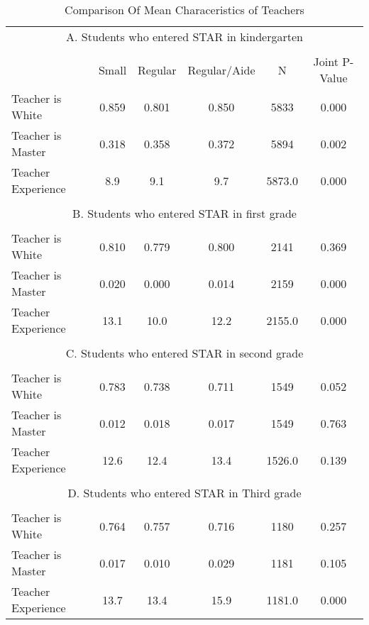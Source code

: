 \documentclass{article}
\begin{document}
\begin{table}[htbp]
  \centering
  \caption{Comparison Of Mean Characeristics of Teachers}
    \begin{tabular}{llccccc}
    \toprule
    \multicolumn{7}{c}{A. Students who entered STAR in kindergarten} \\
          &       &       &       &       &       &  \\
          &       & Small & Regular & Regular/Aide & N     & Joint P-Value \\
    \midrule
    \multicolumn{2}{l}{Teacher is White} & 0.859  & 0.801  & 0.850  & 5833  & 0.000  \\
    \multicolumn{2}{l}{Teacher is Master} & 0.318  & 0.358  & 0.372  & 5894  & 0.002  \\
    \multicolumn{2}{l}{Teacher Experience} & 8.9   & 9.1   & 9.7   & 5873.0  & 0.000  \\
          &       &       &       &       &       &  \\
    \multicolumn{7}{c}{B. Students who entered STAR in first grade} \\
    \multicolumn{2}{l}{} &       &       &       &       &  \\
    \multicolumn{2}{l}{Teacher is White} & 0.810  & 0.779  & 0.800  & 2141  & 0.369  \\
    \multicolumn{2}{l}{Teacher is Master} & 0.020  & 0.000  & 0.014  & 2159  & 0.000  \\
    \multicolumn{2}{l}{Teacher Experience} & 13.1  & 10.0  & 12.2  & 2155.0  & 0.000  \\
    \multicolumn{2}{l}{} &       &       &       &       &  \\
    \multicolumn{7}{c}{C. Students who entered STAR in second grade} \\
    \multicolumn{2}{l}{} &       &       &       &       &  \\
    \multicolumn{2}{l}{Teacher is White} & 0.783  & 0.738  & 0.711  & 1549  & 0.052  \\
    \multicolumn{2}{l}{Teacher is Master} & 0.012  & 0.018  & 0.017  & 1549  & 0.763  \\
    \multicolumn{2}{l}{Teacher Experience} & 12.6  & 12.4  & 13.4  & 1526.0  & 0.139  \\
    \multicolumn{2}{l}{} &       &       &       &       &  \\
    \multicolumn{7}{c}{D. Students who entered STAR in Third grade} \\
    \multicolumn{2}{l}{} &       &       &       &       &  \\
    \multicolumn{2}{l}{Teacher is White} & 0.764  & 0.757  & 0.716  & 1180  & 0.257  \\
    \multicolumn{2}{l}{Teacher is Master} & 0.017  & 0.010  & 0.029  & 1181  & 0.105  \\
    \multicolumn{2}{l}{Teacher Experience} & 13.7  & 13.4  & 15.9  & 1181.0  & 0.000  \\
    \bottomrule
    \bottomrule
    \end{tabular}%
  \label{tab:addlabel}%
\end{table}%
\end{document}
